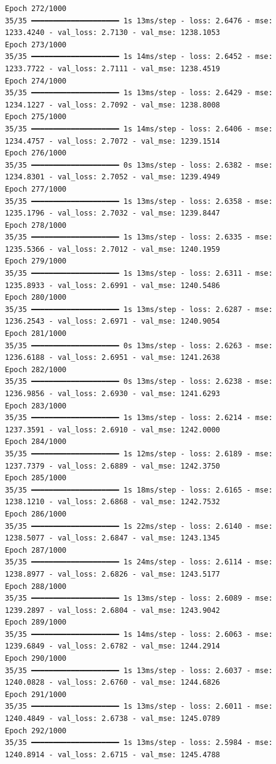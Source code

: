 \documentclass[
  letterpaper,
  DIV=11,
  numbers=noendperiod]{scrreprt}
\begin{document}
\begin{verbatim}
Epoch 272/1000
35/35 ━━━━━━━━━━━━━━━━━━━━ 1s 13ms/step - loss: 2.6476 - mse: 1233.4240 - val_loss: 2.7130 - val_mse: 1238.1053
Epoch 273/1000
35/35 ━━━━━━━━━━━━━━━━━━━━ 1s 14ms/step - loss: 2.6452 - mse: 1233.7722 - val_loss: 2.7111 - val_mse: 1238.4519
Epoch 274/1000
35/35 ━━━━━━━━━━━━━━━━━━━━ 1s 13ms/step - loss: 2.6429 - mse: 1234.1227 - val_loss: 2.7092 - val_mse: 1238.8008
Epoch 275/1000
35/35 ━━━━━━━━━━━━━━━━━━━━ 1s 14ms/step - loss: 2.6406 - mse: 1234.4757 - val_loss: 2.7072 - val_mse: 1239.1514
Epoch 276/1000
35/35 ━━━━━━━━━━━━━━━━━━━━ 0s 13ms/step - loss: 2.6382 - mse: 1234.8301 - val_loss: 2.7052 - val_mse: 1239.4949
Epoch 277/1000
35/35 ━━━━━━━━━━━━━━━━━━━━ 1s 13ms/step - loss: 2.6358 - mse: 1235.1796 - val_loss: 2.7032 - val_mse: 1239.8447
Epoch 278/1000
35/35 ━━━━━━━━━━━━━━━━━━━━ 1s 13ms/step - loss: 2.6335 - mse: 1235.5366 - val_loss: 2.7012 - val_mse: 1240.1959
Epoch 279/1000
35/35 ━━━━━━━━━━━━━━━━━━━━ 1s 13ms/step - loss: 2.6311 - mse: 1235.8933 - val_loss: 2.6991 - val_mse: 1240.5486
Epoch 280/1000
35/35 ━━━━━━━━━━━━━━━━━━━━ 1s 13ms/step - loss: 2.6287 - mse: 1236.2543 - val_loss: 2.6971 - val_mse: 1240.9054
Epoch 281/1000
35/35 ━━━━━━━━━━━━━━━━━━━━ 0s 13ms/step - loss: 2.6263 - mse: 1236.6188 - val_loss: 2.6951 - val_mse: 1241.2638
Epoch 282/1000
35/35 ━━━━━━━━━━━━━━━━━━━━ 0s 13ms/step - loss: 2.6238 - mse: 1236.9856 - val_loss: 2.6930 - val_mse: 1241.6293
Epoch 283/1000
35/35 ━━━━━━━━━━━━━━━━━━━━ 1s 13ms/step - loss: 2.6214 - mse: 1237.3591 - val_loss: 2.6910 - val_mse: 1242.0000
Epoch 284/1000
35/35 ━━━━━━━━━━━━━━━━━━━━ 1s 12ms/step - loss: 2.6189 - mse: 1237.7379 - val_loss: 2.6889 - val_mse: 1242.3750
Epoch 285/1000
35/35 ━━━━━━━━━━━━━━━━━━━━ 1s 18ms/step - loss: 2.6165 - mse: 1238.1210 - val_loss: 2.6868 - val_mse: 1242.7532
Epoch 286/1000
35/35 ━━━━━━━━━━━━━━━━━━━━ 1s 22ms/step - loss: 2.6140 - mse: 1238.5077 - val_loss: 2.6847 - val_mse: 1243.1345
Epoch 287/1000
35/35 ━━━━━━━━━━━━━━━━━━━━ 1s 24ms/step - loss: 2.6114 - mse: 1238.8977 - val_loss: 2.6826 - val_mse: 1243.5177
Epoch 288/1000
35/35 ━━━━━━━━━━━━━━━━━━━━ 1s 13ms/step - loss: 2.6089 - mse: 1239.2897 - val_loss: 2.6804 - val_mse: 1243.9042
Epoch 289/1000
35/35 ━━━━━━━━━━━━━━━━━━━━ 1s 14ms/step - loss: 2.6063 - mse: 1239.6849 - val_loss: 2.6782 - val_mse: 1244.2914
Epoch 290/1000
35/35 ━━━━━━━━━━━━━━━━━━━━ 1s 13ms/step - loss: 2.6037 - mse: 1240.0828 - val_loss: 2.6760 - val_mse: 1244.6826
Epoch 291/1000
35/35 ━━━━━━━━━━━━━━━━━━━━ 1s 13ms/step - loss: 2.6011 - mse: 1240.4849 - val_loss: 2.6738 - val_mse: 1245.0789
Epoch 292/1000
35/35 ━━━━━━━━━━━━━━━━━━━━ 1s 13ms/step - loss: 2.5984 - mse: 1240.8914 - val_loss: 2.6715 - val_mse: 1245.4788

\end{verbatim}
\end{document}
